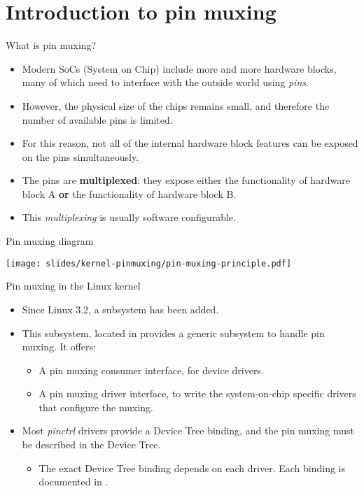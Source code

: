 \section{Introduction to pin muxing}

\begin{frame}{What is pin muxing?}
  \begin{itemize}
  \item Modern SoCs (System on Chip) include more and more hardware
    blocks, many of which need to interface with the outside world
    using {\em pins}.
  \item However, the physical size of the chips remains small, and
    therefore the number of available pins is limited.
  \item For this reason, not all of the internal hardware block
    features can be exposed on the pins simultaneously.
  \item The pins are {\bf multiplexed}: they expose either the
    functionality of hardware block A {\bf or} the functionality of
    hardware block B.
  \item This {\em multiplexing} is usually software configurable.
  \end{itemize}
\end{frame}

\begin{frame}{Pin muxing diagram}
  \begin{center}
    \texttt{[image: slides/kernel-pinmuxing/pin-muxing-principle.pdf]}
  \end{center}
\end{frame}

\begin{frame}{Pin muxing in the Linux kernel}
  \begin{itemize}
  \item Since Linux 3.2, a  subsystem has been added.
  \item This subsystem, located in  provides a
    generic subsystem to handle pin muxing. It offers:
    \begin{itemize}
    \item A pin muxing consumer interface, for device drivers.
    \item A pin muxing driver interface, to write the system-on-chip
      specific drivers that configure the muxing.
    \end{itemize}
  \item Most {\em pinctrl} drivers provide a Device Tree binding, and
    the pin muxing must be described in the Device Tree.
    \begin{itemize}
    \item The exact Device Tree binding depends on each driver. Each
      binding is documented in
      .
    \end{itemize}
  \end{itemize}
\end{frame}

